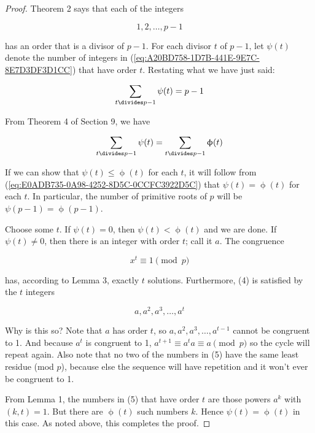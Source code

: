 \documentclass{article}
\theoremstyle{definition} %
\theoremstyle{definition}
\theoremstyle{definition}
\newcommand{\tot}{\upphi}
\theoremstyle{definition}
\begin{document}
  \begin{proof}
    Theorem 2 says that each of the integers
    
    \begin{equation}
      1, 2, \dots, p - 1
      \label{eq:A20BD758-1D7B-441E-9E7C-8E7D3DF3D1CC}
    \end{equation}
    
    has an order that is a divisor of $p - 1$. For each divisor $t$ of $p - 1$, let
    $\psi(t)$ denote the number of integers in (\ref{eq:A20BD758-1D7B-441E-9E7C-8E7D3DF3D1CC})
    that have order $t$. Restating what we have just said:
    
    \[ \sum_{t \divides p - 1} \psi(t) = p - 1 \]
    
    From Theorem 4 of Section 9, we have
    
    \begin{equation}
      \sum_{t \divides p - 1} \psi(t) = \sum_{t \divides p - 1} \tot(t)
      \label{eq:E0ADB735-0A98-4252-8D5C-0CCFC3922D5C}
    \end{equation}
    
    If we can show that $\psi(t) \leq \tot(t)$ for each $t$, it will follow from
    (\ref{eq:E0ADB735-0A98-4252-8D5C-0CCFC3922D5C}) that $\psi(t) = \tot(t)$
    for each $t$. In particular, the number of primitive roots of $p$ will be
    $\psi(p - 1) = \tot(p - 1)$.
    
    Choose some $t$. If $\psi(t) = 0$, then $\psi(t) < \tot(t)$ and we are done.
    If $\psi(t) \neq 0$, then there is an integer with order $t$; call it $a$.
    The congruence
    
    \begin{equation}
      x^t \equiv 1 \pmod{p}
    \end{equation}
    
    has, according to Lemma 3, exactly $t$ solutions. Furthermore, (4) is
    satisfied by the $t$ integers
    
    \begin{equation}
      a, a^2, a^3, \dots, a^t
    \end{equation}
    
    Why is this so? Note that $a$ has order $t$, so $a, a^2, a^3, \dots, a^{t-1}$
    cannot be congruent to 1. And because $a^t$ is congruent to 1, $a^{t + 1} \equiv a^ta \equiv a \pmod{p}$
    so the cycle will repeat again. Also note that no two of the numbers in (5)
    have the same least residue (mod $p$), because else the sequence will have
    repetition and it won't ever be congruent to 1.
    
    From Lemma 1, the numbers in (5) that have order $t$ are those powers $a^k$
    with $(k, t) = 1$. But there are $\tot(t)$ such numbers $k$. Hence $\psi(t) = \tot(t)$
    in this case. As noted above, this completes the proof.
  \end{proof}
  
\end{document}
